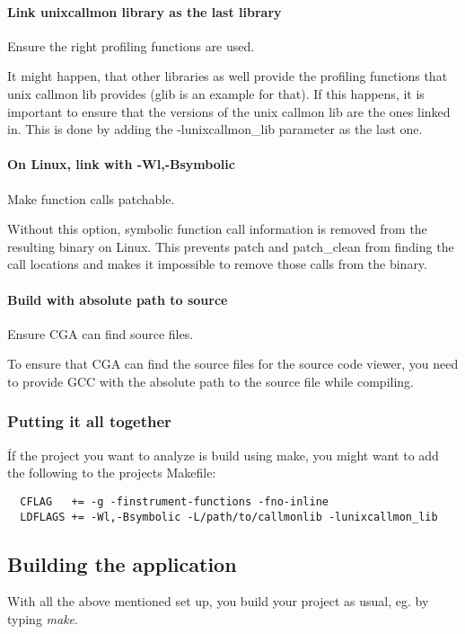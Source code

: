 \paragraph{Link unixcallmon library as the last library} Ensure the right profiling functions are used.

It might happen, that other libraries as well provide the profiling functions that unix callmon lib provides (glib is an example for that). If this happens, it is important to ensure that the versions of the unix callmon lib are the ones linked in. This is done by adding the -lunixcallmon\_lib parameter as the last one.

\paragraph{On Linux, link with -Wl,-Bsymbolic} Make function calls patchable.

Without this option, symbolic function call information is removed from the resulting binary on Linux. This prevents patch and patch\_clean from finding the call locations and makes it impossible to remove those calls from the binary. 

\paragraph{Build with absolute path to source} Ensure CGA can find source files.

To ensure that CGA can find the source files for the source code viewer, you need to provide GCC with the absolute path to the source file while compiling.

\subsubsection{Putting it all together} Íf the project you want to analyze is build using make, you might want to add the following to the projects Makefile:
\begin{verbatim}
  CFLAG   += -g -finstrument-functions -fno-inline 
  LDFLAGS += -Wl,-Bsymbolic -L/path/to/callmonlib -lunixcallmon_lib
\end{verbatim}

\subsection{Building the application} With all the above mentioned set up, you build your project as usual, eg. by typing \emph{make}.

